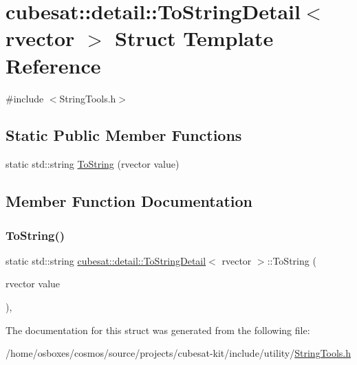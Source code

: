 \hypertarget{structcubesat_1_1detail_1_1ToStringDetail_3_01rvector_01_4}{}\section{cubesat\+:\+:detail\+:\+:To\+String\+Detail$<$ rvector $>$ Struct Template Reference}
\label{structcubesat_1_1detail_1_1ToStringDetail_3_01rvector_01_4}


{\ttfamily \#include $<$String\+Tools.\+h$>$}

\subsection*{Static Public Member Functions}
\begin{DoxyCompactItemize}
\item 
static std\+::string \hyperlink{structcubesat_1_1detail_1_1ToStringDetail_3_01rvector_01_4_af1c849df40e91c693abec04efa678102}{To\+String} (rvector value)
\end{DoxyCompactItemize}


\subsection{Member Function Documentation}
\mbox{\label{structcubesat_1_1detail_1_1ToStringDetail_3_01rvector_01_4_af1c849df40e91c693abec04efa678102}} 
\subsubsection{\texorpdfstring{To\+String()}{ToString()}}
{\footnotesize\ttfamily static std\+::string \hyperlink{structcubesat_1_1detail_1_1ToStringDetail}{cubesat\+::detail\+::\+To\+String\+Detail}$<$ rvector $>$\+::To\+String (\begin{DoxyParamCaption}\item[{rvector}]{value }\end{DoxyParamCaption})\hspace{0.3cm}{\ttfamily [inline]}, {\ttfamily [static]}}



The documentation for this struct was generated from the following file\+:\begin{DoxyCompactItemize}
\item 
/home/osboxes/cosmos/source/projects/cubesat-\/kit/include/utility/\hyperlink{StringTools_8h}{String\+Tools.\+h}\end{DoxyCompactItemize}
